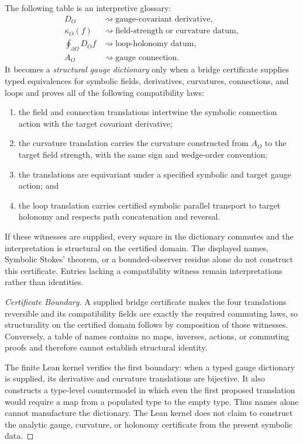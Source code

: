 \begin{proposition}
\label{proposition:bk4_gauge_dictionary}
The following table is an interpretive glossary:
\begin{align}
D_O &\rightsquigarrow \text{gauge-covariant derivative}, \\
\kappa_O(f) &\rightsquigarrow \text{field-strength or curvature datum}, \\
\oint_{\partial\Omega}D_Of &\rightsquigarrow \text{loop-holonomy datum}, \\
A_O &\rightsquigarrow \text{gauge connection}.
\end{align}
It becomes a \emph{structural gauge dictionary} only when a bridge certificate
supplies typed equivalences for symbolic fields, derivatives, curvatures,
connections, and loops and proves all of the following compatibility laws:
\begin{enumerate}
  \item the field and connection translations intertwine the symbolic
  connection action with the target covariant derivative;
  \item the curvature translation carries the curvature constructed from
  $A_O$ to the target field strength, with the same sign and wedge-order
  convention;
  \item the translations are equivariant under a specified symbolic and target
  gauge action; and
  \item the loop translation carries certified symbolic parallel transport to
  target holonomy and respects path concatenation and reversal.
\end{enumerate}
If these witnesses are supplied, every square in the dictionary commutes and
the interpretation is structural on the certified domain.  The displayed names,
Symbolic Stokes' theorem, or a bounded-observer residue alone do not construct
this certificate.  Entries lacking a compatibility witness remain
interpretations rather than identities.
\end{proposition}

\begin{proof}[Certificate Boundary]
\label{proof:bk4_gauge_dictionary}
A supplied bridge certificate makes the four translations reversible and its
compatibility fields are exactly the required commuting laws, so structurality
on the certified domain follows by composition of those witnesses.  Conversely,
a table of names contains no maps, inverses, actions, or commuting proofs and
therefore cannot establish structural identity.

The finite Lean kernel verifies the first boundary: when a typed gauge
dictionary is supplied, its derivative and curvature translations are
bijective.  It also constructs a type-level countermodel in which even the
first proposed translation would require a map from a populated type to the
empty type.  Thus names alone cannot manufacture the dictionary.  The Lean
kernel does not claim to construct the analytic gauge, curvature, or holonomy
certificate from the present symbolic data.
\end{proof}

